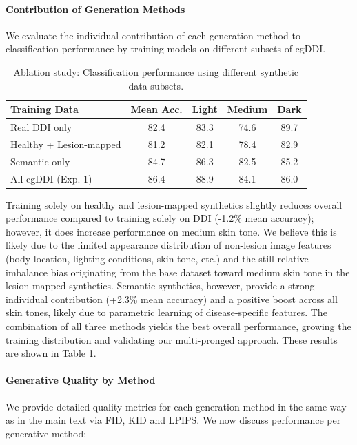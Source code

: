 \documentclass[11pt]{ucthesis}
\begin{document}
\paragraph{Contribution of Generation Methods}

We evaluate the individual contribution of each generation method to classification performance by training models on different subsets of cgDDI.

\begin{table}[h]
\centering
\caption{Ablation study: Classification performance using different synthetic data subsets.}
\label{cgddi:tab:ablation}
\begin{tabular}{lcccc}
\toprule
Training Data & Mean Acc. & Light & Medium & Dark \\
\midrule
Real DDI only & 82.4 & 83.3 & 74.6 & 89.7 \\
Healthy + Lesion-mapped & 81.2 & 82.1 & 78.4 & 82.9 \\
Semantic only & 84.7 & 86.3 & 82.5 & 85.2 \\
All cgDDI (Exp. 1) & 86.4 & 88.9 & 84.1 & 86.0 \\
\bottomrule
\end{tabular}
\end{table}

Training solely on healthy and lesion-mapped synthetics slightly reduces overall performance compared to training solely on DDI (-1.2\% mean accuracy); however, it does increase performance on medium skin tone. We believe this is likely due to the limited appearance distribution of non-lesion image features (body location, lighting conditions, skin tone, etc.) and the still relative imbalance bias originating from the base dataset toward medium skin tone in the lesion-mapped synthetics. Semantic synthetics, however, provide a strong individual contribution (+2.3\% mean accuracy) and a positive boost across all skin tones, likely due to parametric learning of disease-specific features. The combination of all three methods yields the best overall performance, growing the training distribution and validating our multi-pronged approach. These results are shown in Table \ref{cgddi:tab:ablation}.

\paragraph{Generative Quality by Method}

We provide detailed quality metrics for each generation method in the same way as in the main text via FID, KID and LPIPS. We now discuss performance per generative method:
\end{document}
